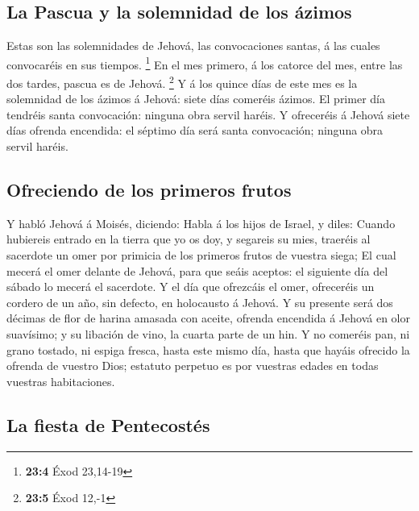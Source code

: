 \hypertarget{la-pascua-y-la-solemnidad-de-los-uxe1zimos}{%
\subsection{La Pascua y la solemnidad de los
ázimos}\label{la-pascua-y-la-solemnidad-de-los-uxe1zimos}}

 Estas son las solemnidades de Jehová, las convocaciones
santas, á las cuales convocaréis en sus tiempos. \footnote{\textbf{23:4}
  Éxod 23,14-19}  En el mes primero, á los catorce del mes,
entre las dos tardes, pascua es de Jehová. \footnote{\textbf{23:5} Éxod
  12,-1}  Y á los quince días de este mes es la solemnidad
de los ázimos á Jehová: siete días comeréis ázimos.  El
primer día tendréis santa convocación: ninguna obra servil haréis.
 Y ofreceréis á Jehová siete días ofrenda encendida: el
séptimo día será santa convocación; ninguna obra servil haréis.

\hypertarget{ofreciendo-de-los-primeros-frutos}{%
\subsection{Ofreciendo de los primeros
frutos}\label{ofreciendo-de-los-primeros-frutos}}

 Y habló Jehová á Moisés, diciendo:  Habla á
los hijos de Israel, y diles: Cuando hubiereis entrado en la tierra que
yo os doy, y segareis su mies, traeréis al sacerdote un omer por
primicia de los primeros frutos de vuestra siega;  El cual
mecerá el omer delante de Jehová, para que seáis aceptos: el siguiente
día del sábado lo mecerá el sacerdote.  Y el día que
ofrezcáis el omer, ofreceréis un cordero de un año, sin defecto, en
holocausto á Jehová.  Y su presente será dos décimas de
flor de harina amasada con aceite, ofrenda encendida á Jehová en olor
suavísimo; y su libación de vino, la cuarta parte de un hin.
 Y no comeréis pan, ni grano tostado, ni espiga fresca,
hasta este mismo día, hasta que hayáis ofrecido la ofrenda de vuestro
Dios; estatuto perpetuo es por vuestras edades en todas vuestras
habitaciones.

\hypertarget{la-fiesta-de-pentecostuxe9s}{%
\subsection{La fiesta de
Pentecostés}\label{la-fiesta-de-pentecostuxe9s}}

